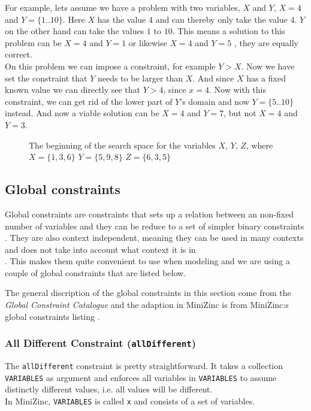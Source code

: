 For example, lets assume we have a problem with two variables, $X$ and $Y$, $X = 4$ and $Y = \{1..10\}$. Here $X$ has the value $4$ and can thereby only take the value $4$. $Y$ on the other hand can take the values $1$ to $10$. This means a solution to this problem can be $X = 4$ and $Y = 1$ or likewise $X = 4$ and $Y = 5$ , they are equally correct.\\
On this problem we can impose a constraint, for example $Y > X$. Now we have set the constraint that $Y$ needs to be larger than $X$. And since $X$ has a fixed known value we can directly see that $Y > 4$, since $x = 4$. Now with this constraint, we can get rid of the lower part of $Y$'s domain and now $Y = \{5..10\}$ instead. And now a viable solution can be $X = 4$ and $Y = 7$, but not $X = 4$ and $Y = 3$.

\begin{figure}
  \caption{The beginning of the search space for the variables $X$, $Y$, $Z$, where $X=\{1,3,6\}$ $Y=\{5,9,8\}$ $Z=\{6,3,5\}$}
  \label{fig:search_space}
\end{figure}

\subsection{Global constraints}
Global constraints are constraints that sets up a relation between an non-fixed number of variables and they can be reduce to a set of simpler binary constraints\\\cite{global_const}. They are also context independent, meaning they can be used in many contexts and does not take into account what context it is in\\\cite{global_constraint_catalogue}. This makes them quite convenient to use when modeling and we are using a couple of global constraints that are listed below.

The general discription of the global constraints in this section come from the \emph{Global Constraint Catalogue} \cite{global_constraint_catalogue} and the adaption in MiniZinc is from MiniZinc:s global constraints listing \cite{mz_global_constraints}.

\subsubsection{All Different Constraint (\texttt{allDifferent})}
The \texttt{allDifferent} constraint is pretty straightforward. It takes a collection \texttt{VARIABLES} as argument and enforces all variables in \texttt{VARIABLES} to assume distinctly different values, i.e. all values will be different.
\\
In MiniZinc, \texttt{VARIABLES} is called \texttt{x} and consists of a set of variables.

